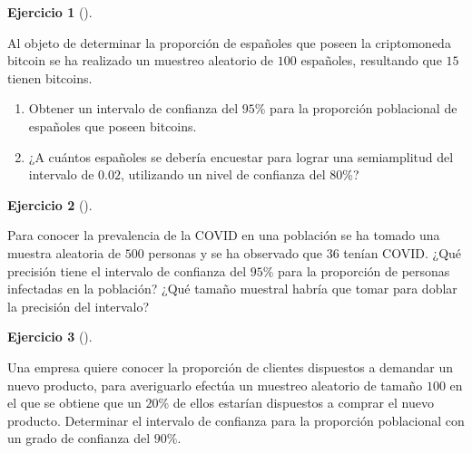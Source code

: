 \documentclass[
  a4paper,
]{scrreport}
\theoremstyle{definition}
\newtheorem{exercise}{Ejercicio}[chapter]
\theoremstyle{remark}
\begin{document}
\begin{exercise}[]\protect\hypertarget{exr-intervalo-confianza-media-bitcoin}{}\label{exr-intervalo-confianza-media-bitcoin}

Al objeto de determinar la proporción de españoles que poseen la
criptomoneda bitcoin se ha realizado un muestreo aleatorio de \(100\)
españoles, resultando que \(15\) tienen bitcoins.

\begin{enumerate}
\def\labelenumi{\alph{enumi}.}
\item
  Obtener un intervalo de confianza del \(95\)\% para la proporción
  poblacional de españoles que poseen bitcoins.
\item
  ¿A cuántos españoles se debería encuestar para lograr una semiamplitud
  del intervalo de \(0.02\), utilizando un nivel de confianza del
  \(80\)\%?
\end{enumerate}

\end{exercise}

\begin{exercise}[]\protect\hypertarget{exr-intervalo-confianza-proporcion-covid}{}\label{exr-intervalo-confianza-proporcion-covid}

Para conocer la prevalencia de la COVID en una población se ha tomado
una muestra aleatoria de \(500\) personas y se ha observado que \(36\)
tenían COVID. ¿Qué precisión tiene el intervalo de confianza del
\(95\)\% para la proporción de personas infectadas en la población? ¿Qué
tamaño muestral habría que tomar para doblar la precisión del intervalo?

\end{exercise}

\begin{exercise}[]\protect\hypertarget{exr-intervalo-confianza-proporcion-demanda}{}\label{exr-intervalo-confianza-proporcion-demanda}

Una empresa quiere conocer la proporción de clientes dispuestos a
demandar un nuevo producto, para averiguarlo efectúa un muestreo
aleatorio de tamaño \(100\) en el que se obtiene que un \(20\)\% de
ellos estarían dispuestos a comprar el nuevo producto. Determinar el
intervalo de confianza para la proporción poblacional con un grado de
confianza del \(90\)\%.

\end{exercise}
\end{document}
